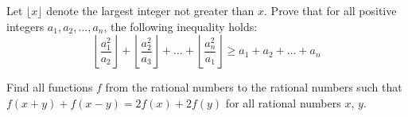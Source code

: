 \documentclass{article}
\begin{document}
	
	Let $\lfloor x \rfloor$ denote the largest integer not greater than $x$. Prove that for all positive integers $a_1, a_2, \dots, a_n$, the following inequality holds:
	\[
	\left\lfloor \frac{a_1^2}{a_2} \right\rfloor + \left\lfloor \frac{a_2^2}{a_3} \right\rfloor + \dots + \left\lfloor \frac{a_n^2}{a_1} \right\rfloor \geq a_1 + a_2 + \dots + a_n
	\]
	
	Find all functions $f$ from the rational numbers to the rational numbers such that $f(x + y) + f(x-y) = 2f(x) + 2f(y)$ for all rational numbers $x$, $y$.
	
\end{document}
